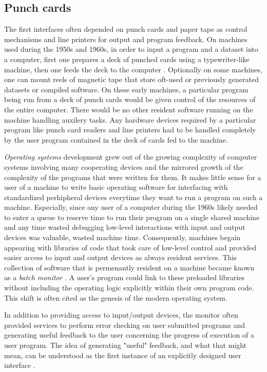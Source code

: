 \subsection{Punch cards}

The first interfaces often depended on punch cards and paper tape as control mechanisms and line printers for output and program feedback. On machines used during the 1950s and 1960s, in order to input a program and a dataset into a computer, first one prepares a deck of punched cards using a typewriter-like machine, then one feeds the deck to the computer \cite{oshistory2011}. Optionally on some machines, one can mount reels of magnetic tape that store oft-used or previously generated datasets or compiled software. On these early machines, a particular program being run from a deck of punch cards would be given control of the resources of the entire computer. There would be no other resident software running on the machine handling auxilery tasks. Any hardware devices required by a particular program like punch card readers and line printers had to be handled completely by the user program contained in the deck of cards fed to the machine. 

\emph{Operating systems} development grew out of the growing complexity of computer systems involving many cooperating devices and the mirrored growth of the complexity of the programs that were written for them. It makes little sense for a user of a machine to write basic operating software for interfacing with standardized perhipheral devices everytime they want to run a program on such a machine. Especially, since any user of a computer during the 1960s likely needed to enter a queue to reserve time to run their program on a single shared machine and any time wasted debugging low-level interactions with input and output devices was valuable, wasted machine time. Consequently, machines begain appearing with libraries of code that took care of low-level control and provided easier access to input and output devices as always resident services. This collection of software that is permenantly resident on a machine became known as a \emph{batch monitor} \cite{os2000}. A user's program could link to these preloaded libraries without including the operating logic explicitly within their own program code. This shift is often cited as the genesis of the modern operating system.

In addition to providing access to input/output devices, the monitor often provided services to perform error checking on user submitted programs and generating useful feedback to the user concerning the progress of execution of a user program. The idea of generating "useful" feedback, and what that might mean, can be understood as the first instance of an explicitly designed user interface \cite{unix2008}.

